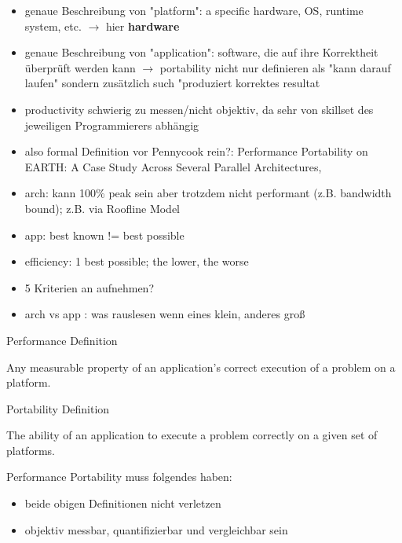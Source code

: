 \newpage
\cite{pennycook_implications_2019}

\begin{itemize}
    \item genaue Beschreibung von "platform": a specific hardware, OS, runtime system, etc. $\rightarrow$ hier \textbf{hardware}
    \item genaue Beschreibung von "application": software, die auf ihre Korrektheit überprüft werden kann $\rightarrow$ portability nicht nur definieren als "kann darauf laufen" sondern zusätzlich such "produziert korrektes resultat
    \item productivity schwierig zu messen/nicht objektiv, da sehr von skillset des jeweiligen Programmierers abhängig
    \item also formal Definition vor Pennycook rein?: Performance Portability on EARTH: A Case Study Across Several Parallel Architectures,
    \item arch: kann 100\% peak sein aber trotzdem nicht performant (z.B. bandwidth bound); z.B. via Roofline Model
    \item app: best known != best possible
    \item efficiency: 1 best possible; the lower, the worse
    \item 5 Kriterien an \pp aufnehmen?
    \item arch vs app : was rauslesen wenn eines klein, anderes groß
\end{itemize}

Performance Definition
\begin{quotebox}{\cite{pennycook_implications_2019}}
    Any measurable property of an application’s correct execution of a problem on a platform.
\end{quotebox}

Portability Definition
\begin{quotebox}{\cite{pennycook_implications_2019}}
    The ability of an application to execute a problem correctly on a given set of platforms.
\end{quotebox}

Performance Portability muss folgendes haben: 
\begin{itemize}
    \item beide obigen Definitionen nicht verletzen
    \item objektiv messbar, quantifizierbar und vergleichbar sein
\end{itemize}

